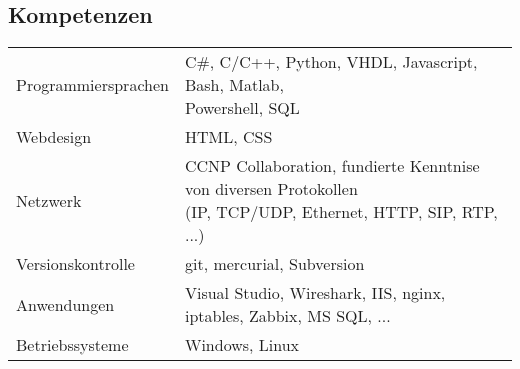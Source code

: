 \subsection*{Kompetenzen}
\begin{tabularx}{\textwidth}{l|l}
Programmiersprachen & \makecell[cl]{C\#, C/C++, Python, VHDL, Javascript, Bash, Matlab, \\ Powershell, SQL} \\
Webdesign & HTML, CSS \\
Netzwerk & \makecell[cl]{CCNP Collaboration, fundierte Kenntnise von diversen Protokollen \\ (IP, TCP/UDP, Ethernet, HTTP, SIP, RTP, ...)} \\
Versionskontrolle & git, mercurial, Subversion \\
Anwendungen & Visual Studio, Wireshark, IIS, nginx, iptables, Zabbix, MS SQL, ... \\
Betriebssysteme & Windows, Linux
\end{tabularx}

